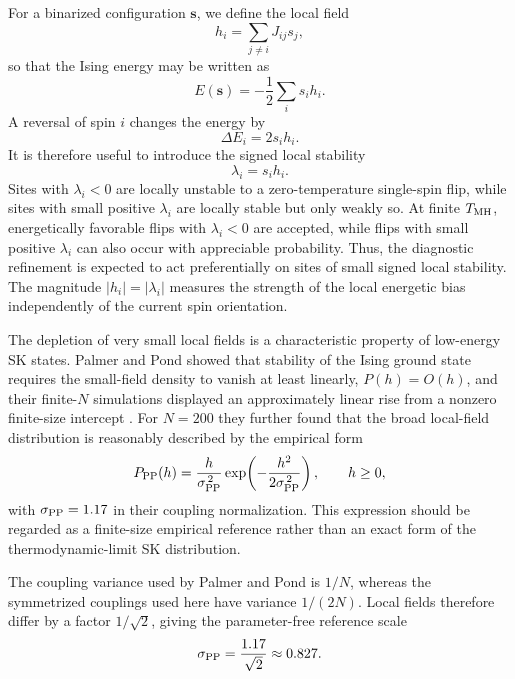 \documentclass[
reprint,
amsmath,amssymb,
aps,
pre,
floatfix,
]{revtex4-2}
\begin{document}
For a binarized configuration $\mathbf{s}$, we define the local field
\begin{equation}
    h_i = \sum_{j\neq i} J_{ij}s_j ,
    \label{eq:local_field}
\end{equation}
so that the Ising energy may be written as
\begin{equation}
    E(\mathbf{s})
    =
    -\frac{1}{2}\sum_i s_i h_i .
    \label{eq:energy_local_field}
\end{equation}
A reversal of spin $i$ changes the energy by
\begin{equation}
    \Delta E_i = 2s_i h_i .
    \label{eq:single_flip_energy}
\end{equation}
It is therefore useful to introduce the signed local stability
\begin{equation}
    \lambda_i = s_i h_i .
    \label{eq:local_stability}
\end{equation}
Sites with $\lambda_i<0$ are locally unstable to a zero-temperature
single-spin flip, while sites with small positive $\lambda_i$ are locally
stable but only weakly so. At finite $T_{\rm MH}$, energetically favorable
flips with $\lambda_i<0$ are accepted, while flips with small positive
$\lambda_i$ can also occur with appreciable probability. Thus, the
diagnostic refinement is expected to act preferentially on sites of small
signed local stability. The magnitude $|h_i|=|\lambda_i|$ measures the
strength of the local energetic bias independently of the current spin
orientation.


The depletion of very small local fields is a characteristic property of
low-energy SK states. Palmer and Pond showed that stability of the Ising
ground state requires the small-field density to vanish at least linearly,
$P(h)=O(h)$, and their finite-$N$ simulations displayed an approximately
linear rise from a nonzero finite-size intercept \cite{Palmer1979}.
For $N=200$ they further found that the broad local-field distribution is
reasonably described by the empirical form
\begin{equation}
    P_{\rm PP}(h)
    =
    \frac{h}{\sigma_{\rm PP}^{\,2}}
    \exp\!\left(
        -\frac{h^2}{2\sigma_{\rm PP}^{\,2}}
    \right),
    \qquad h\geq0 ,
    \label{eq:palmer_distribution}
\end{equation}
with $\sigma_{\rm PP}=1.17$ in their coupling normalization. This expression
should be regarded as a finite-size empirical reference rather than an
exact form of the thermodynamic-limit SK distribution.

The coupling variance used by Palmer and Pond is $1/N$, whereas the
symmetrized couplings used here have variance $1/(2N)$. Local fields
therefore differ by a factor $1/\sqrt{2}$, giving the parameter-free
reference scale
\begin{equation}
    \sigma_{\rm PP}
    =
    \frac{1.17}{\sqrt{2}}
    \approx
    0.827 .
    \label{eq:palmer_rescaling}
\end{equation}
\end{document}
